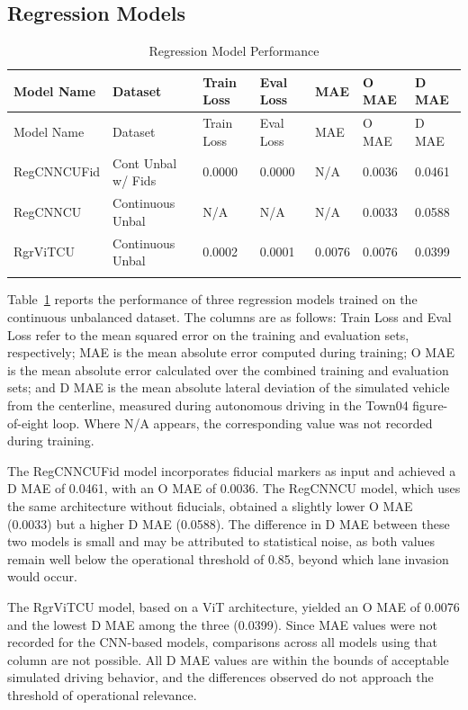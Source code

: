 \subsection{Regression Models}
\begin{longtable}{@{}lllllll@{}}
\toprule
Model Name & Dataset & Train Loss & Eval Loss & MAE & O MAE & D MAE \\
\midrule
\endfirsthead
\toprule
Model Name & Dataset & Train Loss & Eval Loss & MAE & O MAE & D MAE \\
\midrule
\endhead
RegCNNCUFid & Cont Unbal w/ Fids & 0.0000 & 0.0000 & N/A & 0.0036 & 0.0461 \\
RegCNNCU & Continuous Unbal & N/A & N/A & N/A & 0.0033 & 0.0588 \\
RgrViTCU & Continuous Unbal & 0.0002 & 0.0001 & 0.0076 & 0.0076 & 0.0399 \\
\bottomrule
\caption{Regression Model Performance}
\label{results:table_regression_models}
\end{longtable}

Table~\ref{results:table_regression_models} reports the performance of three regression models trained on the continuous unbalanced dataset. The columns are as follows: Train Loss and Eval Loss refer to the mean squared error on the training and evaluation sets, respectively; MAE is the mean absolute error computed during training; O MAE is the mean absolute error calculated over the combined training and evaluation sets; and D MAE is the mean absolute lateral deviation of the simulated vehicle from the centerline, measured during autonomous driving in the Town04 figure-of-eight loop. Where N/A appears, the corresponding value was not recorded during training.

The RegCNNCUFid model incorporates fiducial markers as input and achieved a D MAE of 0.0461, with an O MAE of 0.0036. The RegCNNCU model, which uses the same architecture without fiducials, obtained a slightly lower O MAE (0.0033) but a higher D MAE (0.0588). The difference in D MAE between these two models is small and may be attributed to statistical noise, as both values remain well below the operational threshold of 0.85, beyond which lane invasion would occur.

The RgrViTCU model, based on a ViT architecture, yielded an O MAE of 0.0076 and the lowest D MAE among the three (0.0399). Since MAE values were not recorded for the CNN-based models, comparisons across all models using that column are not possible. All D MAE values are within the bounds of acceptable simulated driving behavior, and the differences observed do not approach the threshold of operational relevance.


